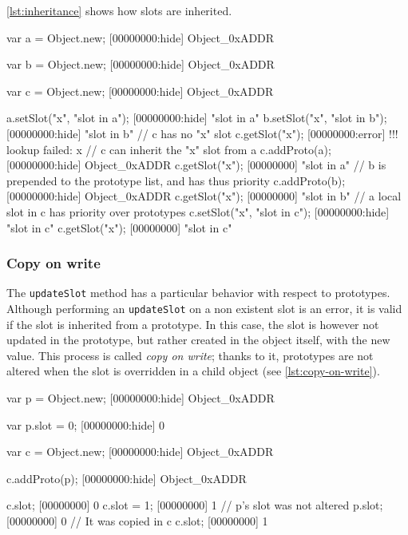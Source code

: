 \autoref{lst:inheritance} shows how slots are inherited.

\begin{urbiscript}[caption=Slots inheritance, label=lst:inheritance,
  float=\floatpos]
var a = Object.new;
[00000000:hide] Object_0xADDR

var b = Object.new;
[00000000:hide] Object_0xADDR

var c = Object.new;
[00000000:hide] Object_0xADDR

a.setSlot("x", "slot in a");
[00000000:hide] "slot in a"
b.setSlot("x", "slot in b");
[00000000:hide] "slot in b"
// c has no "x" slot
c.getSlot("x");
[00000000:error] !!! lookup failed: x
// c can inherit the "x" slot from a
c.addProto(a);
[00000000:hide] Object_0xADDR
c.getSlot("x");
[00000000] "slot in a"
// b is prepended to the prototype list, and has thus priority
c.addProto(b);
[00000000:hide] Object_0xADDR
c.getSlot("x");
[00000000] "slot in b"
// a local slot in c has priority over prototypes
c.setSlot("x", "slot in c");
[00000000:hide] "slot in c"
c.getSlot("x");
[00000000] "slot in c"
\end{urbiscript}

\subsubsection{Copy on write}

The \lstinline|updateSlot| method has a particular behavior with
respect to prototypes. Although performing an \lstinline|updateSlot|
on a non existent slot is an error, it is valid if the slot is
inherited from a prototype. In this case, the slot is however not
updated in the prototype, but rather created in the object itself,
with the new value. This process is called \emph{copy on write}; thanks
to it, prototypes are not altered when the slot is overridden in a
child object (see \autoref{lst:copy-on-write}).

\begin{urbiscript}[caption=Copy on write, label=lst:copy-on-write,
  float=\floatpos]
var p = Object.new;
[00000000:hide] Object_0xADDR

var p.slot = 0;
[00000000:hide] 0

var c = Object.new;
[00000000:hide] Object_0xADDR

c.addProto(p);
[00000000:hide] Object_0xADDR

c.slot;
[00000000] 0
c.slot = 1;
[00000000] 1
// p's slot was not altered
p.slot;
[00000000] 0
// It was copied in c
c.slot;
[00000000] 1
\end{urbiscript}

